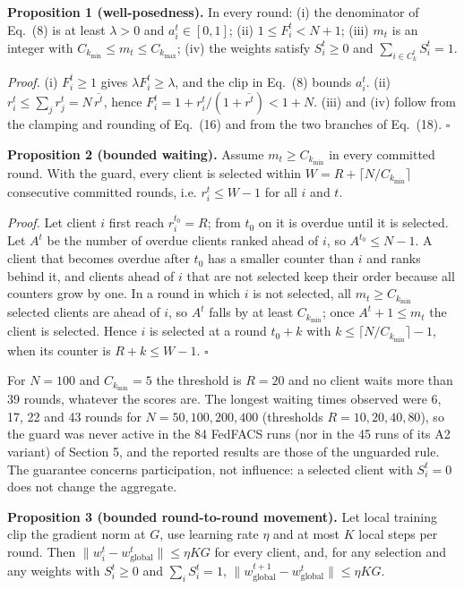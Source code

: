 \documentclass[pdflatex,sn-mathphys-num,oneside]{sn-jnl}%
\theoremstyle{thmstyleone}%
\theoremstyle{thmstyletwo}%
\theoremstyle{thmstylethree}%
\begin{document}
\textbf{Proposition 1 (well-posedness).} In every round: (i) the denominator of Eq.~(8) is at least $\lambda>0$ and $a_i^t\in[0,1]$; (ii) $1\le F_i^t<N+1$; (iii) $m_t$ is an integer with $C_{k_{\min}}\le m_t\le C_{k_{\max}}$; (iv) the weights satisfy $S_i^t\ge 0$ and $\sum_{i\in C_k^t}S_i^t=1$.

\textit{Proof.} (i) $F_i^t\ge 1$ gives $\lambda F_i^t\ge\lambda$, and the clip in Eq.~(8) bounds $a_i^t$. (ii) $r_i^t\le\sum_j r_j^t=N\,\overline{r^t}$, hence $F_i^t=1+r_i^t/(1+\overline{r^t})<1+N$. (iii) and (iv) follow from the clamping and rounding of Eq.~(16) and from the two branches of Eq.~(18). \hfill$\square$

\textbf{Proposition 2 (bounded waiting).} Assume $m_t\ge C_{k_{\min}}$ in every committed round. With the guard, every client is selected within $W=R+\lceil N/C_{k_{\min}}\rceil$ consecutive committed rounds, i.e. $r_i^t\le W-1$ for all $i$ and $t$.

\textit{Proof.} Let client $i$ first reach $r_i^{t_0}=R$; from $t_0$ on it is overdue until it is selected. Let $A^t$ be the number of overdue clients ranked ahead of $i$, so $A^{t_0}\le N-1$. A client that becomes overdue after $t_0$ has a smaller counter than $i$ and ranks behind it, and clients ahead of $i$ that are not selected keep their order because all counters grow by one. In a round in which $i$ is not selected, all $m_t\ge C_{k_{\min}}$ selected clients are ahead of $i$, so $A^t$ falls by at least $C_{k_{\min}}$; once $A^t+1\le m_t$ the client is selected. Hence $i$ is selected at a round $t_0+k$ with $k\le\lceil N/C_{k_{\min}}\rceil-1$, when its counter is $R+k\le W-1$. \hfill$\square$

For $N=100$ and $C_{k_{\min}}=5$ the threshold is $R=20$ and no client waits more than 39 rounds, whatever the scores are. The longest waiting times observed were 6, 17, 22 and 43 rounds for $N=50,100,200,400$ (thresholds $R=10,20,40,80$), so the guard was never active in the 84 FedFACS runs (nor in the 45 runs of its A2 variant) of Section 5, and the reported results are those of the unguarded rule. The guarantee concerns participation, not influence: a selected client with $S_i^t=0$ does not change the aggregate.

\textbf{Proposition 3 (bounded round-to-round movement).} Let local training clip the gradient norm at $G$, use learning rate $\eta$ and at most $K$ local steps per round. Then $\|w_i^t-w_{\text{global}}^t\|\le\eta KG$ for every client, and, for any selection and any weights with $S_i^t\ge 0$ and $\sum_i S_i^t=1$, $\|w_{\text{global}}^{t+1}-w_{\text{global}}^t\|\le\eta KG$.
\end{document}
